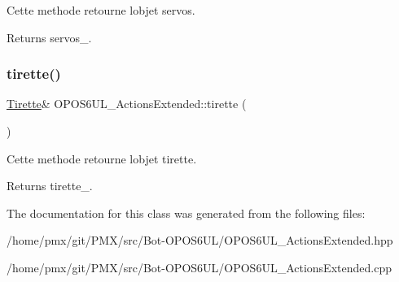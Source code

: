 Cette methode retourne l\textquotesingle{}objet servos. 

\begin{DoxyReturn}{Returns}
servos\+\_\+. 
\end{DoxyReturn}
\mbox{\label{classOPOS6UL__ActionsExtended_a790945aecd3fcc71bf1c8de38859c7c4}} 
\subsubsection{\texorpdfstring{tirette()}{tirette()}}
{\footnotesize\ttfamily \hyperlink{classTirette}{Tirette}\& O\+P\+O\+S6\+U\+L\+\_\+\+Actions\+Extended\+::tirette (\begin{DoxyParamCaption}{ }\end{DoxyParamCaption})\hspace{0.3cm}{\ttfamily [inline]}}



Cette methode retourne l\textquotesingle{}objet tirette. 

\begin{DoxyReturn}{Returns}
tirette\+\_\+. 
\end{DoxyReturn}


The documentation for this class was generated from the following files\+:\begin{DoxyCompactItemize}
\item 
/home/pmx/git/\+P\+M\+X/src/\+Bot-\/\+O\+P\+O\+S6\+U\+L/O\+P\+O\+S6\+U\+L\+\_\+\+Actions\+Extended.\+hpp\item 
/home/pmx/git/\+P\+M\+X/src/\+Bot-\/\+O\+P\+O\+S6\+U\+L/O\+P\+O\+S6\+U\+L\+\_\+\+Actions\+Extended.\+cpp\end{DoxyCompactItemize}
